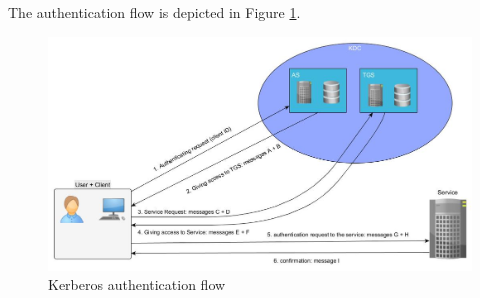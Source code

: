 The authentication flow is depicted in Figure \ref{fig:kerberos}.

\begin{figure}[!ht]
	\centering
	\caption{Kerberos authentication flow}
	\label{fig:kerberos}
	\includegraphics[scale=0.4]{images/kerberos}
\end{figure}

